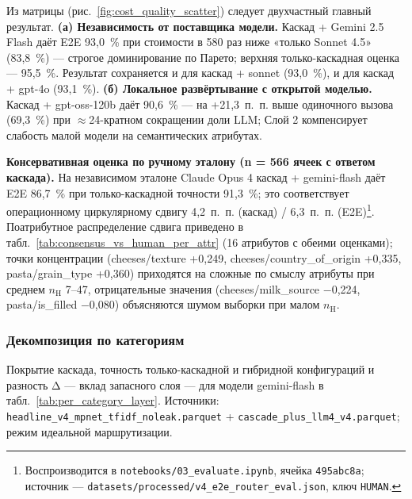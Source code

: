 Из матрицы (рис.~\ref{fig:cost_quality_scatter}) следует двухчастный главный результат. \textbf{(а) Независимость от поставщика модели.} Каскад + Gemini 2.5 Flash даёт E2E 93,0~\% при стоимости в 580 раз ниже «только Sonnet 4.5» (83,8~\%) --- строгое доминирование по Парето; верхняя только-каскадная оценка --- 95,5~\%. Результат сохраняется и для каскад + sonnet (93,0~\%), и для каскад + gpt-4o (93,1~\%). \textbf{(б) Локальное развёртывание с открытой моделью.} Каскад + gpt-oss-120b даёт 90,6~\% --- на +21,3~п.~п. выше одиночного вызова (69,3~\%) при $\approx$24-кратном сокращении доли LLM; Слой 2 компенсирует слабость малой модели на семантических атрибутах.

\textbf{Консервативная оценка по ручному эталону (n = 566 ячеек с ответом каскада).} На независимом эталоне Claude Opus 4 каскад + gemini-flash даёт E2E 86,7~\% при только-каскадной точности 91,3~\%; это соответствует операционному циркулярному сдвигу 4,2~п.~п. (каскад) / 6,3~п.~п. (E2E)\footnote{Воспроизводится в \texttt{notebooks/03\_evaluate.ipynb}, ячейка \texttt{495abc8a}; источник --- \texttt{datasets/processed/v4\_e2e\_router\_eval.json}, ключ \texttt{HUMAN}.}. Поатрибутное распределение сдвига приведено в табл.~\ref{tab:consensus_vs_human_per_attr} (16 атрибутов с обеими оценками); точки концентрации (cheeses/texture +0,249, cheeses/country\_of\_origin +0,335, pasta/grain\_type +0,360) приходятся на сложные по смыслу атрибуты при среднем $n_{\text{H}}$ 7--47, отрицательные значения (cheeses/milk\_source $-$0,224, pasta/is\_filled $-$0,080) объясняются шумом выборки при малом $n_{\text{H}}$.



\subsubsection{Декомпозиция по категориям}
\label{subsec:per_category_decomposition}

Покрытие каскада, точность только-каскадной и гибридной конфигураций и разность Δ — вклад запасного слоя — для модели gemini-flash в табл.~\ref{tab:per_category_layer}. Источники: \texttt{headline\_v4\_mpnet\_tfidf\_noleak.parquet} + \texttt{cascade\_plus\_llm4\_v4.parquet}; режим идеальной маршрутизации.

